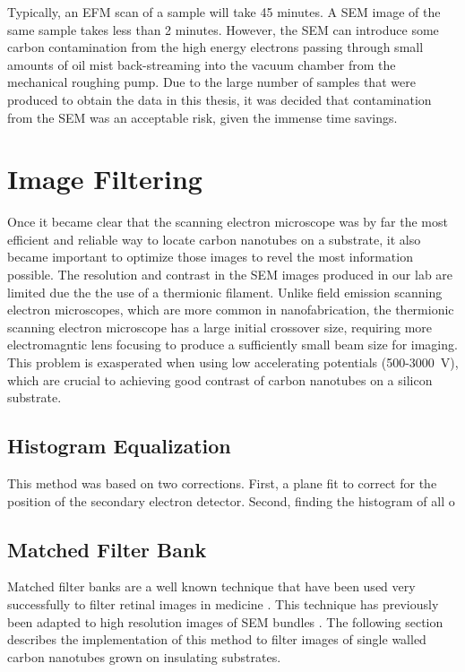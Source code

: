 Typically, an EFM scan of a sample will take 45 minutes. A SEM image of the same sample takes less than 2 minutes. However, the SEM can introduce some carbon contamination from the high energy electrons passing through small amounts of oil mist back-streaming into the vacuum chamber from the mechanical roughing pump. Due to the large number of samples that were produced to obtain the data in this thesis, it was decided that contamination from the SEM was an acceptable risk, given the immense time savings.

\section{Image Filtering}

Once it became clear that the scanning electron microscope was by far the most efficient and reliable way to locate carbon nanotubes on a substrate, it also became important to optimize those images to revel the most information possible. The resolution and contrast in the SEM images produced in our lab are limited due the the use of a thermionic  filament. Unlike field emission scanning electron microscopes, which are more common in nanofabrication, the thermionic scanning electron microscope has a large initial crossover size, requiring more electromagntic lens focusing to produce a sufficiently small beam size for imaging. This problem is exasperated when using low accelerating potentials (500-\SI{3000}{\volt}), which are crucial to achieving good contrast of carbon nanotubes on a silicon substrate.

\subsection{Histogram Equalization}

This method was based on two corrections. First, a plane fit to correct for the position of the secondary electron detector. Second, finding the histogram of all o

\subsection{Matched Filter Bank}

Matched filter banks are a well known technique that have been used very successfully to filter retinal images in medicine \cite{Chaudhuri1989}. This technique has previously been adapted to high resolution images of SEM bundles \cite{Guerrero2014}. The following section describes the implementation of this method to filter images of single walled carbon nanotubes grown on insulating substrates. 

